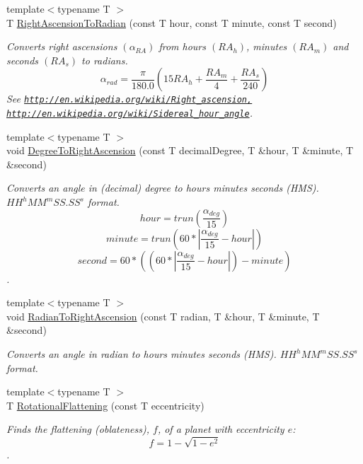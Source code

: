 \begin{DoxyCompactItemize}
{\footnotesize template$<$typename T $>$ }\\T \mbox{\hyperlink{group___e_g_x_phys-_astrophysics-_right_ascension_ga63a3103990c95078443e39a5b487ab0d}{Right\+Ascension\+To\+Radian}} (const T hour, const T minute, const T second)
\begin{DoxyCompactList}\small\item\em Converts right ascensions $(\alpha_{RA})$ from hours $(RA_h)$, minutes $(RA_m)$ and seconds $(RA_s)$ to radians. \[\alpha_{rad}=\frac{\pi}{180.0}(15 RA_h + \frac{RA_m}{4} + \frac{RA_s}{240})\] See \href{http://en.wikipedia.org/wiki/Right_ascension,}{\tt http\+://en.\+wikipedia.\+org/wiki/\+Right\+\_\+ascension,} \href{http://en.wikipedia.org/wiki/Sidereal_hour_angle}{\tt http\+://en.\+wikipedia.\+org/wiki/\+Sidereal\+\_\+hour\+\_\+angle}. \end{DoxyCompactList}\item 
{\footnotesize template$<$typename T $>$ }\\void \mbox{\hyperlink{group___e_g_x_phys-_astrophysics-_right_ascension_ga6fdbd35a030d278f396496899a1c236f}{Degree\+To\+Right\+Ascension}} (const T decimal\+Degree, T \&hour, T \&minute, T \&second)
\begin{DoxyCompactList}\small\item\em Converts an angle in (decimal) degree to hours minutes seconds (H\+MS). ${HH}^{h}{MM}^{m}{SS.SS}^{s}$ format. \[hour=trun(\frac{\alpha_{deg}}{15})\] \[minute=trun(60 * |\frac{\alpha_{deg}}{15} - hour|)\] \[second=60 * ((60 * |\frac{\alpha_{deg}}{15} - hour|)-minute)\]. \end{DoxyCompactList}\item 
{\footnotesize template$<$typename T $>$ }\\void \mbox{\hyperlink{group___e_g_x_phys-_astrophysics-_right_ascension_ga624dd87144a17d19d0100500c34da978}{Radian\+To\+Right\+Ascension}} (const T radian, T \&hour, T \&minute, T \&second)
\begin{DoxyCompactList}\small\item\em Converts an angle in radian to hours minutes seconds (H\+MS). ${HH}^h{MM}^m{SS.SS}^s$ format. \end{DoxyCompactList}\item 
{\footnotesize template$<$typename T $>$ }\\T \mbox{\hyperlink{group___e_g_x_phys-_astrophysics-_rotational_flattening_gabba90db442c4ec9e12523adb00d66c44}{Rotational\+Flattening}} (const T eccentricity)
\begin{DoxyCompactList}\small\item\em Finds the flattening (oblateness), $f$, of a planet with eccentricity $e$\+: \[ f = 1 - \sqrt{1-e^2} \]. \end{DoxyCompactList}\item 

\end{DoxyCompactItemize}
